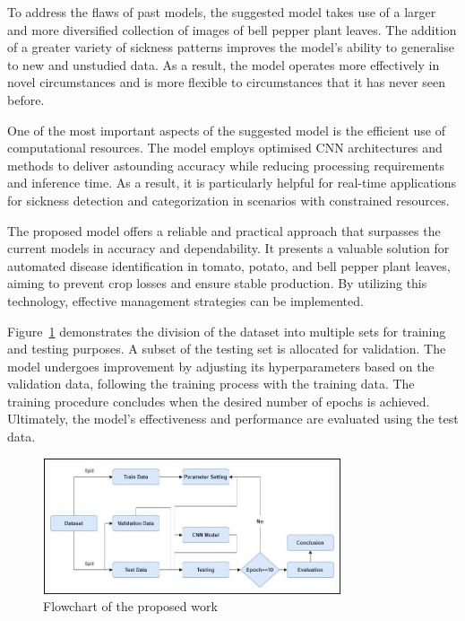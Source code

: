 \documentclass[conference]{IEEEtran}
\begin{document}
To address the flaws of past models, the suggested model takes use of a larger and more diversified collection of images of bell pepper plant leaves. The addition of a greater variety of sickness patterns improves the model's ability to generalise to new and unstudied data. As a result, the model operates more effectively in novel circumstances and is more flexible to circumstances that it has never seen before.

One of the most important aspects of the suggested model is the efficient use of computational resources. The model employs optimised CNN architectures and methods to deliver astounding accuracy while reducing processing requirements and inference time. As a result, it is particularly helpful for real-time applications for sickness detection and categorization in scenarios with constrained resources.


The proposed model offers a reliable and practical approach that surpasses the current models in accuracy and dependability. It presents a valuable solution for automated disease identification in tomato, potato, and bell pepper plant leaves, aiming to prevent crop losses and ensure stable production. By utilizing this technology, effective management strategies can be implemented.

Figure~\ref{fig: Figure 1} demonstrates the division of the dataset into multiple sets for training and testing purposes. A subset of the testing set is allocated for validation. The model undergoes improvement by adjusting its hyperparameters based on the validation data, following the training process with the training data. The training procedure concludes when the desired number of epochs is achieved. Ultimately, the model's effectiveness and performance are evaluated using the test data.


\begin{figure}[H]
 \includegraphics[width=8.8cm, height=4cm]{Tomato Final Flowchart.jpg}
\caption{Flowchart of the proposed work}
\label{fig: Figure 1}
\end{figure}
\end{document}

